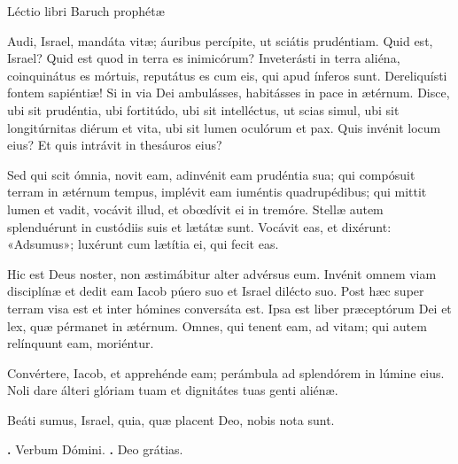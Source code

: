 
Léctio libri Baruch prophétæ

Audi, Israel, mandáta vitæ; áuribus percípite, ut sciátis prudéntiam.
Quid est, Israel? Quid est quod in terra es inimicórum? Inveterásti in terra aliéna, coinquinátus es mórtuis, reputátus es cum eis, qui apud ínferos sunt.
Dereliquísti fontem sapiéntiæ! 
Si in via Dei ambulásses, habitásses in pace in ætérnum.
Disce, ubi sit prudéntia, ubi fortitúdo, ubi sit intelléctus, ut scias simul, ubi sit longitúrnitas diérum et vita, ubi sit lumen oculórum et pax.
Quis invénit locum eius? Et quis intrávit in thesáuros eius?

Sed qui scit ómnia, novit eam, adinvénit eam prudéntia sua; qui compósuit terram in ætérnum tempus, implévit eam iuméntis quadrupédibus; qui mittit lumen et vadit, vocávit illud, et obœdívit ei in tremóre.
Stellæ autem splenduérunt in custódiis suis et lætátæ sunt.
Vocávit eas, et dixérunt: «Adsumus»; luxérunt cum lætítia ei, qui fecit eas.

Hic est Deus noster, non æstimábitur alter advérsus eum.
Invénit omnem viam disciplínæ et dedit eam Iacob púero suo et Israel dilécto suo. Post hæc super terram visa est et inter hómines conversáta est.
Ipsa est liber præceptórum Dei et lex, quæ pérmanet in ætérnum. Omnes, qui tenent eam, ad vitam; qui autem relínquunt eam, moriéntur.

Convértere, Iacob, et apprehénde eam; perámbula ad splendórem in lúmine eius. Noli dare álteri glóriam tuam et dignitátes tuas genti aliénæ.

Beáti sumus, Israel, quia, quæ placent Deo, nobis nota sunt.

\textbf{\Vbar.} Verbum Dómini.
\textbf{\Rbar.} Deo grátias.
\par